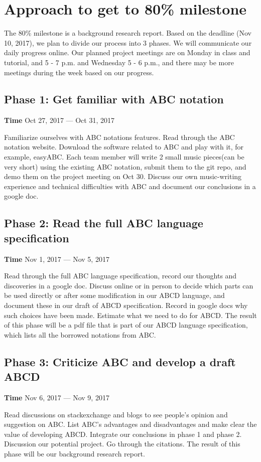 \section{Approach to get to 80\% milestone}
The 80\% milestone is a background research report. Based on the deadline (Nov 10, 2017), we plan to divide our process into 3 phases. We will communicate our daily progress online. Our planned project meetings are on Monday in class and tutorial, and 5 - 7 p.m. and Wednesday 5 - 6 p.m., and there may be more meetings during the week based on our progress.

\subsection{Phase 1: Get familiar with ABC notation}
\textbf{Time} Oct 27, 2017 --- Oct 31, 2017

\noindent Familiarize ourselves with ABC notations features. Read through the ABC notation website. Download the software related to ABC and play with it, for example, easyABC. Each team member will write 2 small music pieces(can be very short) using the existing ABC notation, submit them to the git repo, and demo them on the project meeting on Oct 30. Discuss our own music-writing experience and technical difficulties with ABC and document our conclusions in a google doc.

\subsection{Phase 2: Read the full ABC language specification}
\textbf{Time} Nov 1, 2017 --- Nov 5, 2017

\noindent Read through the full ABC language specification, record our thoughts and discoveries in a google doc. Discuss online or in person to decide which parts can be used directly or after some modification in our ABCD language, and document these in our draft of ABCD specification. Record in google docs why such choices have been made. Estimate what we need to do for ABCD. The result of this phase will be a pdf file that is part of our ABCD language specification, which lists all the borrowed notations from ABC.

\subsection{Phase 3: Criticize ABC and develop a draft ABCD}
\textbf{Time} Nov 6, 2017 --- Nov 9, 2017

\noindent Read discussions on stackexchange and blogs to see people's opinion and suggestion on ABC. List ABC's advantages and disadvantages and make clear the value of developing ABCD. Integrate our conclusions in phase 1 and phase 2. Discussion our potential project. Go through the citations. The result of this phase will be our background research report.

